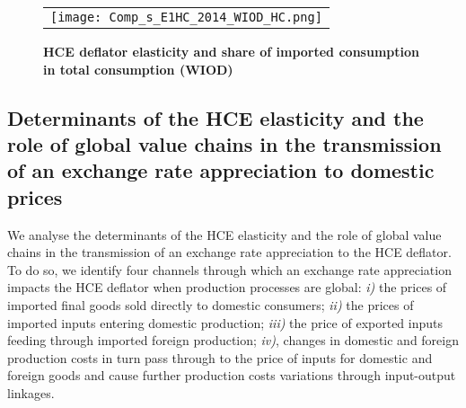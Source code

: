 \documentclass[12pt,a4paper]{paper}
\begin{document}
\begin{figure}[H]
	\centering
	\caption{\footnotesize{\textbf{HCE deflator elasticity and share of imported consumption in total consumption (WIOD)}}}
	\begin{tabular}{c}
		\texttt{[image: Comp\_s\_E1HC\_2014\_WIOD\_HC.png]}\\
	\end{tabular}
	\label{fig:WIOD_HC_E1HC}
\end{figure}


%

\subsection{Determinants of the HCE elasticity and the role of global value chains in the transmission of an exchange rate appreciation to domestic prices}\label{subsec:channels}

We analyse the determinants of the HCE elasticity and the role of global value chains in the transmission of an exchange rate appreciation to the HCE deflator. 
To do so, we identify four channels through which an exchange rate appreciation impacts the HCE deflator when production processes are global: \textit{i)} the prices of imported ﬁnal goods sold directly to domestic consumers;
\textit{ii)} the prices of imported inputs entering domestic production; 
\textit{iii)} the price of exported inputs feeding through imported foreign production;
\textit{iv)}, changes in domestic and foreign production costs in turn pass through to the price of inputs for domestic and foreign goods and cause further production costs variations through input-output linkages.\\
\end{document}
